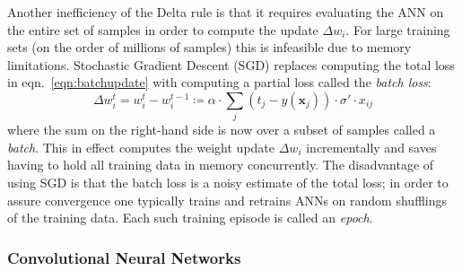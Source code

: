 Another inefficiency of the Delta rule is that it requires evaluating the ANN on the entire set of samples in order to compute the update \(\Delta w_i\).
%
For large training sets (on the order of millions of samples) this is infeasible due to memory limitations.
%
Stochastic Gradient Descent (SGD) replaces computing the total loss in eqn.~\eqref{eqn:batchupdate} with computing a partial loss called the \textit{batch loss}:
\begin{equation}
    \Delta w_i^t = w_i^t - w_i^{t-1} \coloneqq \alpha \cdot \sum_j (t_j-y(\mathbf{x}_j))\cdot \sigma'\cdot x_{ij}
    \label{eqn:sgd}
\end{equation}
where the sum on the right-hand side is now over a subset of samples called a \textit{batch}.
%
This in effect computes the weight update \(\Delta w_i\) incrementally and saves having to hold all training data in memory concurrently.
%
The disadvantage of using SGD is that the batch loss is a noisy estimate of the total loss; in order to assure convergence one typically trains and retrains ANNs on random shufflings of the training data.
%
Each such training episode is called an \textit{epoch}.
%





\subsubsection{Convolutional Neural Networks}




